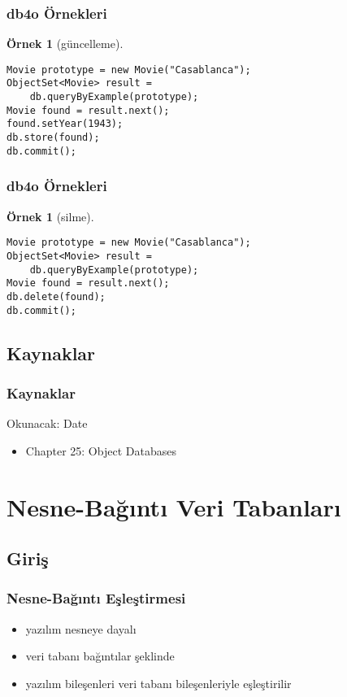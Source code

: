 \documentclass[dvipsnames]{beamer}
\theoremstyle{definition}
\theoremstyle{example}
\newtheorem{ornek}[theorem]{Örnek}
\theoremstyle{plain}
\begin{document}
\begin{frame}[fragile]
  \frametitle{db4o Örnekleri}

  \begin{ornek}[güncelleme]
    \begin{lstlisting}
Movie prototype = new Movie("Casablanca");
ObjectSet<Movie> result =
    db.queryByExample(prototype);
Movie found = result.next();
found.setYear(1943);
db.store(found);
db.commit();
    \end{lstlisting}
  \end{ornek}
\end{frame}

\begin{frame}[fragile]
  \frametitle{db4o Örnekleri}

  \begin{ornek}[silme]
    \begin{lstlisting}
Movie prototype = new Movie("Casablanca");
ObjectSet<Movie> result =
    db.queryByExample(prototype);
Movie found = result.next();
db.delete(found);
db.commit();
    \end{lstlisting}
  \end{ornek}
\end{frame}

\subsection*{Kaynaklar}

\begin{frame}
  \frametitle{Kaynaklar}

  \begin{block}{Okunacak: Date}
    \begin{itemize}
      \item Chapter 25: \alert{Object Databases}
    \end{itemize}
  \end{block}
\end{frame}

\section{Nesne-Bağıntı Veri Tabanları}

\subsection{Giriş}

\begin{frame}
  \frametitle{Nesne-Bağıntı Eşleştirmesi}

  \begin{itemize}
    \item yazılım nesneye dayalı
    \item veri tabanı bağıntılar şeklinde
    \item yazılım bileşenleri veri tabanı bileşenleriyle eşleştirilir
  \end{itemize}
\end{frame}
\end{document}
